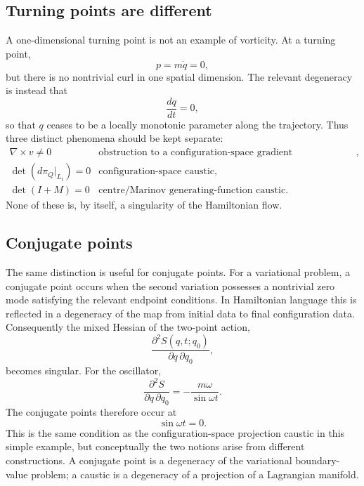 \subsection{Turning points are different}
A one-dimensional turning point is not an example of vorticity.
At a turning point,
\begin{equation}
 p=m\dot q=0,
\end{equation}
but there is no nontrivial curl in one spatial dimension.
The relevant degeneracy is instead that
\begin{equation}
 \frac{dq}{dt}=0,
\end{equation}
so that \(q\) ceases to be a locally monotonic parameter along the trajectory.
Thus three distinct phenomena should be kept separate:
\begin{equation}
\begin{array}{lll}
\nabla\times v\neq0
&
\text{obstruction to a configuration-space gradient representation},
\\[1mm]
\det(d\pi_Q|_{L_t})=0
&
\text{configuration-space caustic},
\\[1mm]
\det(I+M)=0
&
\text{centre/Marinov generating-function caustic}.
\end{array}
\end{equation}
None of these is, by itself, a singularity of the Hamiltonian flow.
\subsection{Conjugate points}
The same distinction is useful for conjugate points.
For a variational problem, a conjugate point occurs when the second variation possesses a nontrivial zero mode satisfying the relevant endpoint conditions.  In Hamiltonian language this is reflected in a degeneracy of the map from initial data to final configuration data.  Consequently the mixed Hessian of the two-point action,
\begin{equation}
 \frac{\partial^2 S(q,t;q_0)}{\partial q\,\partial q_0},
\end{equation}
becomes singular.
For the oscillator,
\begin{equation}
 \frac{\partial^2S}{\partial q\,\partial q_0}
 =
 -\frac{m\omega}{\sin\omega t}.
\end{equation}
The conjugate points therefore occur at
\begin{equation}
 \sin\omega t=0.
\end{equation}
This is the same condition as the configuration-space projection caustic in
this simple example, but conceptually the two notions arise from different
constructions.  A conjugate point is a degeneracy of the variational
boundary-value problem; a caustic is a degeneracy of a projection of a
Lagrangian manifold.
